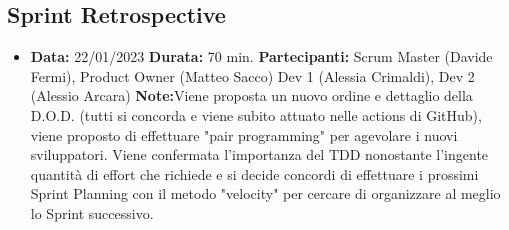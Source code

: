 \documentclass{article}
\begin{document}
    \subsection{Sprint Retrospective}
    \begin{itemize}
        \item \textbf{Data:} 22/01/2023
        \newline \textbf{Durata:} 70 min.
        \newline \textbf{Partecipanti:} Scrum Master (Davide Fermi), Product Owner (Matteo Sacco) Dev 1 (Alessia Crimaldi), Dev 2 (Alessio Arcara)
        \newline \textbf{Note:}Viene proposta un nuovo ordine e dettaglio della D.O.D. (tutti si concorda e viene subito attuato nelle actions di GitHub), viene proposto di effettuare "pair programming" per agevolare i nuovi sviluppatori. Viene confermata l'importanza del TDD nonostante l'ingente quantità di effort che richiede e si decide concordi di effettuare i prossimi Sprint Planning con il metodo "velocity" per cercare di organizzare al meglio lo Sprint successivo.
    \end{itemize}
\end{document}
